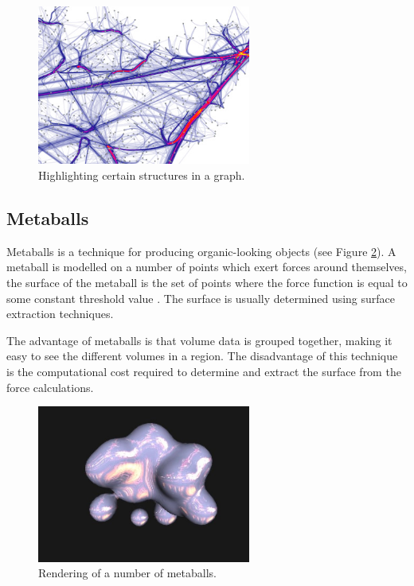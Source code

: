 \begin{figure}[h!]
  \begin{center}
    \includegraphics[width=70mm]{graph_highlight}
  \end{center}
  \caption{Highlighting certain structures in a graph.}
  \label{fig:background_highlight}
\end{figure}


\subsection{Metaballs}
\label{sub:background_metaballs}

Metaballs is a technique for producing organic-looking objects (see Figure
\ref{fig:background_metaballs}). A metaball is modelled on a number of points
which exert forces around themselves, the surface of the metaball is the set of
points where the force function is equal to some constant threshold value
\citep{blinn82}. The surface is usually determined using surface extraction
techniques.

The advantage of metaballs is that volume data is grouped together, making it
easy to see the different volumes in a region. The disadvantage of this
technique is the computational cost required to determine and extract the
surface from the force calculations.

\begin{figure}[h!]
  \begin{center}
    \includegraphics[width=70mm]{metaballs}
  \end{center}
  \caption{Rendering of a number of metaballs.}
  \label{fig:background_metaballs}
\end{figure}

